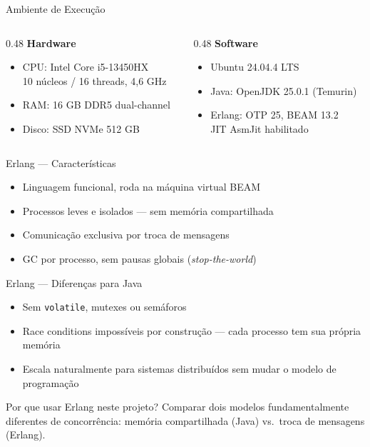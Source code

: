 \begin{frame}{Ambiente de Execução}
    \begin{columns}
        \begin{column}{0.48\textwidth}
            \textbf{Hardware}
            \begin{itemize}
                \item CPU: Intel Core i5-13450HX \\
                      10 núcleos / \alert{16 threads}, 4,6 GHz
                \item RAM: 16 GB DDR5 dual-channel
                \item Disco: SSD NVMe 512 GB
            \end{itemize}
        \end{column}
        \begin{column}{0.48\textwidth}
            \textbf{Software}
            \begin{itemize}
                \item Ubuntu 24.04.4 LTS
                \item Java: \alert{OpenJDK 25.0.1} (Temurin)
                \item Erlang: \alert{OTP 25}, BEAM 13.2 \\
                      JIT AsmJit habilitado
            \end{itemize}
        \end{column}
    \end{columns}
\end{frame}

\begin{frame}{Erlang --- Características}
    \begin{itemize}
        \item Linguagem funcional, roda na máquina virtual BEAM
        \item Processos leves e isolados --- sem memória compartilhada
        \item Comunicação exclusiva por troca de mensagens
        \item GC por processo, sem pausas globais (\textit{stop-the-world})
    \end{itemize}
\end{frame}

\begin{frame}{Erlang --- Diferenças para Java}
    \begin{itemize}
        \item Sem \texttt{volatile}, mutexes ou semáforos
        \item Race conditions \alert{impossíveis por construção} --- cada processo tem sua própria memória
        \item Escala naturalmente para sistemas distribuídos sem mudar o modelo de programação
    \end{itemize}

    \vspace{1em}
    \begin{block}{Por que usar Erlang neste projeto?}
        Comparar dois modelos fundamentalmente diferentes de concorrência:
        memória compartilhada (Java) vs.\ troca de mensagens (Erlang).
    \end{block}
\end{frame}
